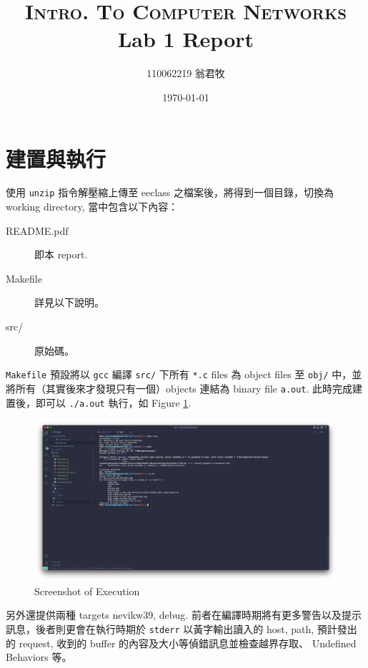 \documentclass[12pt, a4paper]{article}
\title{\textsc{Intro. To Computer Networks}\\Lab 1 Report}
\author{110062219 翁君牧}
\date{\today}
\begin{document}
\maketitle

\tableofcontents

\section{建置與執行}

使用 \texttt{unzip} 指令解壓縮上傳至 eeclass 之檔案後，將得到一個目錄，切換為 working directory, 當中包含以下內容：

\begin{description}
\item[\ttfamily README.pdf] 即本 report.
\item[\ttfamily Makefile] 詳見以下說明。
\item[\ttfamily src/] 原始碼。
\end{description}

\texttt{Makefile} 預設將以 \texttt{gcc} 編譯 \texttt{src/} 下所有 \texttt{*.c} files 為 object files 至 \texttt{obj/} 中，並將所有（其實後來才發現只有一個）objects 連結為 binary file \texttt{a.out}. 此時完成建置後，即可以 \texttt{./a.out} 執行，如 Figure \ref{fig:screenshot}.

\begin{figure}[htbp]
\centering
\includegraphics[width=\linewidth]{screenshot}
\caption{Screenshot of Execution}
\label{fig:screenshot}
\end{figure}

另外還提供兩種 targets \textsf{nevikw39}, \textsf{debug}. 前者在編譯時期將有更多警告以及提示訊息，後者則更會在執行時期於 \texttt{stderr} 以黃字輸出讀入的 host, path, 預計發出的 request, 收到的 buffer 的內容及大小等偵錯訊息並檢查越界存取、 Undefined Behaviors 等。
\end{document}
